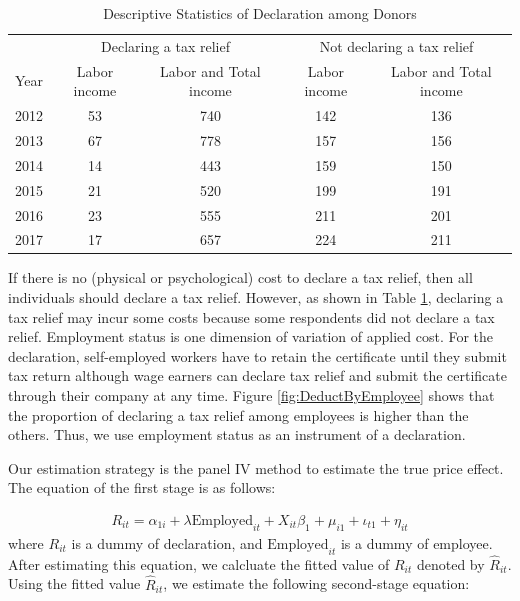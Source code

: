 \documentclass[
  11pt,
  a4paper,
]{article}
\begin{document}
\begin{table}

\caption{\label{tab:SummaryDeduct}Descriptive Statistics of Declaration among Donors}
\centering
\fontsize{9}{11}\selectfont
\begin{tabular}[t]{lcccc}
\toprule
\multicolumn{1}{c}{} & \multicolumn{2}{c}{Declaring a tax relief} & \multicolumn{2}{c}{Not declaring a tax relief} \\
\cmidrule(l{3pt}r{3pt}){2-3} \cmidrule(l{3pt}r{3pt}){4-5}
Year & Labor income & Labor and Total income & Labor income & Labor and Total income\\
\midrule
2012 & 53 & 740 & 142 & 136\\
2013 & 67 & 778 & 157 & 156\\
2014 & 14 & 443 & 159 & 150\\
2015 & 21 & 520 & 199 & 191\\
2016 & 23 & 555 & 211 & 201\\
2017 & 17 & 657 & 224 & 211\\
\bottomrule
\end{tabular}
\end{table}

If there is no (physical or psychological) cost to declare a tax relief,
then all individuals should declare a tax relief.
However, as shown in Table \ref{tab:SummaryDeduct},
declaring a tax relief may incur some costs because some respondents did not declare a tax relief.
Employment status is one dimension of variation of applied cost.
For the declaration, self-employed workers have to retain the certificate until they submit tax return although wage earners can declare tax relief and submit the certificate through their company at any time.
Figure \ref{fig:DeductByEmployee} shows that
the proportion of declaring a tax relief among employees is higher than the others.
Thus, we use employment status as an instrument of a declaration.

Our estimation strategy is the panel IV method to estimate the true price effect.
The equation of the first stage is as follows:

\begin{align}
  R_{it}
  = \alpha_{1i} + \lambda \text{Employed}_{it} + X_{it} \beta_1
  + \mu_{i1} + \iota_{t1} + \eta_{it} \label{eq:stage1}
\end{align}
where \(R_{it}\) is a dummy of declaration, and \(\text{Employed}_{it}\) is a dummy of employee.
After estimating this equation, we calcluate the fitted value of \(R_{it}\) denoted by \(\hat{R}_{it}\).
Using the fitted value \(\hat{R}_{it}\), we estimate the following second-stage equation:
\end{document}
